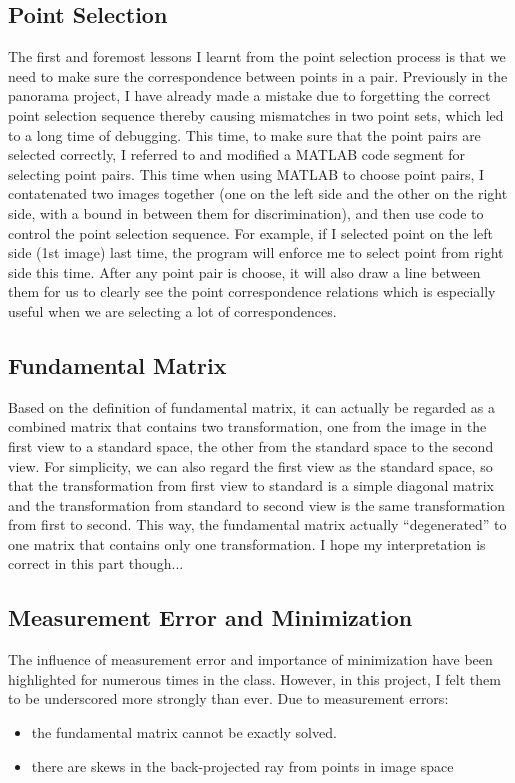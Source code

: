 \documentclass[conference]{IEEEtran}
\begin{document}
\subsection{Point Selection}
The first and foremost lessons I learnt from the point selection process is that we need to make sure the correspondence between points in a pair. Previously in the panorama project, I have already made a mistake due to forgetting the correct point selection sequence thereby causing mismatches in two point sets, which led to a long time of debugging. This time, to make sure that the point pairs are selected correctly, I referred to and modified a MATLAB code segment for selecting point pairs. This time when using MATLAB to choose point pairs, I contatenated two images together (one on the left side and the other on the right side, with a bound in between them for discrimination), and then use code to control the point selection sequence. For example, if I selected point on the left side (1st image) last time, the program will enforce me to select point from right side this time. After any point pair is choose, it will also draw a line between them for us to clearly see the point correspondence relations which is especially useful when we are selecting a lot of correspondences.
\subsection{Fundamental Matrix}
Based on the definition of fundamental matrix, it can actually be regarded as a combined matrix that contains two transformation, one from the image in the first view to a standard space, the other from the standard space to the second view. For simplicity, we can also regard the first view as the standard space, so that the transformation from first view to standard is a simple diagonal matrix and the transformation from standard to second view is the same transformation from first to second. This way, the fundamental matrix actually ``degenerated'' to one matrix that contains only one transformation. I hope my interpretation is correct in this part though...
\subsection{Measurement Error and Minimization}
The influence of measurement error and importance of minimization have been highlighted for numerous times in the class. However, in this project, I felt them to be underscored more strongly than ever. Due to measurement errors:
\begin{itemize}
	\item the fundamental matrix cannot be exactly solved.
	\item there are skews in the back-projected ray from points in image space
\end{itemize}
\end{document}

